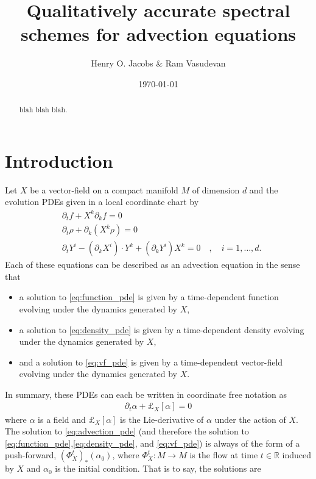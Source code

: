 \documentclass[12pt]{amsart}
\title{Qualitatively accurate spectral schemes for advection equations}
\author{Henry O. Jacobs \& Ram Vasudevan}
\date{\today}
\newcommand{\R}{\ensuremath{\mathbb{R}}}
\begin{document}
\maketitle

\begin{abstract}
  blah blah blah.
\end{abstract}

\section{Introduction}
\label{sec:PDEs}
Let $X$ be a vector-field on a compact manifold $M$ of dimension $d$
and the evolution PDEs given in a local coordinate chart by
\begin{align}
	&\partial_t f + X^k \partial_k f= 0 \label{eq:function_pde} \\
	&\partial_t \rho + \partial_k( X^k \rho) = 0  \label{eq:density_pde} \\
	&\partial_t Y^i - (\partial_k X^i) \cdot Y^k + (\partial_k Y^i) X^k  = 0 \quad , \quad i = 1,\dots,d \label{eq:vf_pde}.
\end{align}
Each of these equations can be described as an advection equation in the sense that
\begin{itemize}
	\item a solution to \eqref{eq:function_pde} is given by a time-dependent function evolving under the dynamics generated by $X$,
	\item a solution to \eqref{eq:density_pde} is given by a time-dependent density evolving under the dynamics generated by $X$,
	\item and a solution to \eqref{eq:vf_pde} is given by a time-dependent vector-field evolving under the dynamics generated by $X$.
\end{itemize}
In summary, these PDEs can each be written in coordinate free notation as
\begin{align}
	\partial_t \alpha + \pounds_{X}[\alpha] = 0 \label{eq:advection_pde}
\end{align}
where $\alpha$ is a field and $\pounds_X[\alpha]$ is the Lie-derivative of $\alpha$ under the action of $X$.
The solution to \eqref{eq:advection_pde} (and therefore the solution to \eqref{eq:function_pde},\eqref{eq:density_pde}, and \eqref{eq:vf_pde}) is always of the form of a push-forward, $(\Phi_{X}^t)_* (\alpha_0)$, where $\Phi_{X}^t : M \to M$ is the flow at time $t \in \R$ induced by $X$ and $\alpha_0$ is the initial condition.
That is to say, the solutions are
\begi
\end{document}
